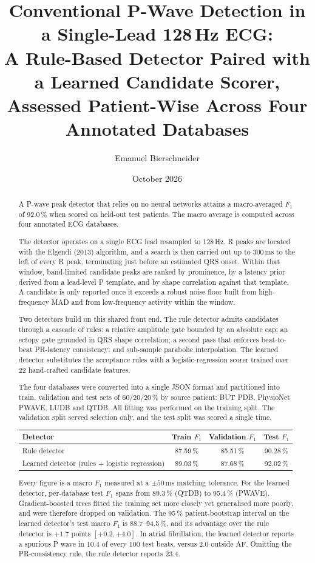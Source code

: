 \documentclass[11pt,a4paper]{article}
\title{Conventional P-Wave Detection in a Single-Lead 128\,Hz ECG:\\
\large A Rule-Based Detector Paired with a Learned Candidate Scorer, Assessed Patient-Wise Across Four Annotated Databases}
\author{Emanuel Bierschneider}
\date{October 2026}
\begin{document}
\maketitle

\begin{abstract}
\noindent
A P-wave peak detector that relies on no neural networks attains a macro-averaged $F_1$ of 92.0\,\% when scored on held-out test patients. The macro average is computed across four annotated ECG databases.

The detector operates on a single ECG lead resampled to 128\,Hz. R peaks are located with the Elgendi (2013) algorithm, and a search is then carried out up to 300\,ms to the left of every R peak, terminating just before an estimated QRS onset. Within that window, band-limited candidate peaks are ranked by prominence, by a latency prior derived from a lead-level P template, and by shape correlation against that template. A candidate is only reported once it exceeds a robust noise floor built from high-frequency MAD and from low-frequency activity within the window.

Two detectors build on this shared front end. The rule detector admits candidates through a cascade of rules: a relative amplitude gate bounded by an absolute cap; an ectopy gate grounded in QRS shape correlation; a second pass that enforces beat-to-beat PR-latency consistency; and sub-sample parabolic interpolation. The learned detector substitutes the acceptance rules with a logistic-regression scorer trained over 22 hand-crafted candidate features.

The four databases were converted into a single JSON format and partitioned into train, validation and test sets of 60/20/20\,\% by source patient: BUT PDB, PhysioNet PWAVE, LUDB and QTDB. All fitting was performed on the training split. The validation split served selection only, and the test split was scored a single time.

\medskip
\begin{center}
\begin{tabular}{lccc}
\toprule
Detector & Train $F_1$ & Validation $F_1$ & Test $F_1$ \\
\midrule
Rule detector & 87.59\,\% & 85.51\,\% & 90.28\,\% \\
Learned detector (rules + logistic regression) & 89.03\,\% & 87.68\,\% & 92.02\,\% \\
\bottomrule
\end{tabular}
\end{center}
\medskip

Every figure is a macro $F_1$ measured at a $\pm50$\,ms matching tolerance. For the learned detector, per-database test $F_1$ spans from 89.3\,\% (QTDB) to 95.4\,\% (PWAVE). Gradient-boosted trees fitted the training set more closely yet generalised more poorly, and were therefore dropped on validation. The 95\,\% patient-bootstrap interval on the learned detector's test macro $F_1$ is 88.7--94.5\,\%, and its advantage over the rule detector is $+1.7$ points $[+0.2, +4.0]$. In atrial fibrillation, the learned detector reports a spurious P wave in 10.4 of every 100 test beats, versus 2.0 outside AF. Omitting the PR-consistency rule, the rule detector reports 23.4.
\end{abstract}
\end{document}
